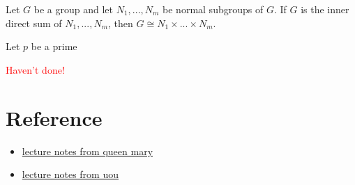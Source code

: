 \begin{theorem}{}{}
    Let $G$ be a group and let $N_1,...,N_m$ be normal subgroups of $G$. 
    If $G$ is the inner direct sum of $N_1,...,N_m$, then $G\cong N_1\times ...\times N_m$.
\end{theorem}


\begin{example}{}{}
    Let $p$ be a prime 
\end{example}
\textcolor{Red}{Haven't done!}


\section{Reference}
\begin{itemize}
    \item \href{https://webspace.maths.qmul.ac.uk/r.a.bailey/MAS305/algnotes14.pdf}{lecture notes from queen mary}
    \item \href{https://www.uou.ac.in/lecturenotes/science/MSCMT-19/unit%201.pdf}{lecture notes from uou}
\end{itemize}

